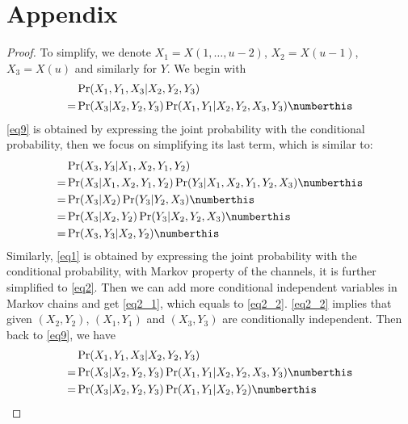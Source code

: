 \section*{Appendix}
\begin{proof}
To simplify, we denote $X_1 = X(1,\dots,u-2)$, $X_2 = X(u-1)$, $X_3 = X(u)$ and similarly for $Y$. We begin with
\begin{subequations}
    \begin{align*}
        &\Pr(X_1,Y_1,X_3|X_2,Y_2,Y_3)\\
        =&\Pr(X_3|X_2,Y_2,Y_3) \Pr(X_1,Y_1|X_2,Y_2,X_3,Y_3) \numberthis \label{eq9}
    \end{align*}
\end{subequations}
\eqref{eq9} is obtained by expressing the joint probability with the conditional probability, then we focus on simplifying its last term, which is similar to:
\begin{subequations}
    \begin{align*}
        &\Pr(X_3,Y_3|X_1,X_2,Y_1,Y_2)\\
        =&\Pr(X_3|X_1,X_2,Y_1,Y_2)\Pr(Y_3|X_1,X_2,Y_1,Y_2,X_3) \numberthis \label{eq1}\\
        =&\Pr(X_3|X_2)\Pr(Y_3|Y_2,X_3) \numberthis \label{eq2}\\
        =&\Pr(X_3|X_2,Y_2)\Pr(Y_3|X_2,Y_2,X_3) \numberthis \label{eq2_1}\\
        =&\Pr(X_3,Y_3|X_2,Y_2) \numberthis \label{eq2_2}\\
    \end{align*}
\end{subequations}
Similarly, \eqref{eq1} is obtained by expressing the joint probability with the conditional probability, 
with Markov property of the channels,
it is further simplified to \eqref{eq2}. Then we can add more conditional independent variables in Markov chains and get \eqref{eq2_1}, which equals to \eqref{eq2_2}. \eqref{eq2_2} implies that given $(X_2,Y_2)$, $(X_1,Y_1)$ and $(X_3,Y_3)$ are conditionally independent. Then back to \eqref{eq9}, we have 
\begin{subequations}
    \begin{align*}
        &\Pr(X_1,Y_1,X_3|X_2,Y_2,Y_3)\\
        =&\Pr(X_3|X_2,Y_2,Y_3) \Pr(X_1,Y_1|X_2,Y_2,X_3,Y_3) \numberthis \label{eq9_1}\\
        =&\Pr(X_3|X_2,Y_2,Y_3)\Pr(X_1,Y_1|X_2,Y_2) \numberthis \label{eq10}\\

\end{align*}
\end{subequations}
\end{proof}
